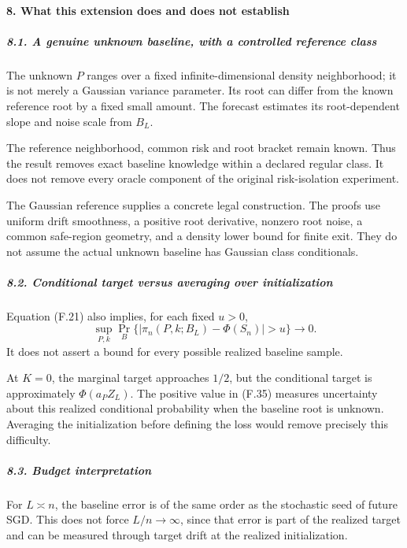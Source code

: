 \paragraph{8. What this extension does and does not
establish}\label{what-this-extension-does-and-does-not-establish}

\subparagraph{8.1. A genuine unknown baseline, with a controlled
reference
class}\label{a-genuine-unknown-baseline-with-a-controlled-reference-class}

The unknown \(P\) ranges over a fixed infinite-dimensional density
neighborhood; it is not merely a Gaussian variance parameter. Its root
can differ from the known reference root by a fixed small amount. The
forecast estimates its root-dependent slope and noise scale from
\(B_L\).

The reference neighborhood, common risk and root bracket remain known.
Thus the result removes exact baseline knowledge within a declared
regular class. It does not remove every oracle component of the original
risk-isolation experiment.

The Gaussian reference supplies a concrete legal construction. The
proofs use uniform drift smoothness, a positive root derivative, nonzero
root noise, a common safe-region geometry, and a density lower bound for
finite exit. They do not assume the actual unknown baseline has Gaussian
class conditionals.

\subparagraph{8.2. Conditional target versus averaging over
initialization}\label{conditional-target-versus-averaging-over-initialization}

Equation (F.21) also implies, for each fixed \(u>0\), \[
\sup_{P,k}\Pr_B\{
|\pi_n(P,k;B_L)-\Phi(S_n)|>u
\}\longrightarrow0.
\] It does not assert a bound for every possible realized baseline
sample.

At \(K=0\), the marginal target approaches \(1/2\), but the conditional
target is approximately \(\Phi(a_PZ_L)\). The positive value in (F.35)
measures uncertainty about this realized conditional probability when
the baseline root is unknown. Averaging the initialization before
defining the loss would remove precisely this difficulty.

\subparagraph{8.3. Budget interpretation}\label{budget-interpretation}

For \(L\asymp n\), the baseline error is of the same order as the
stochastic seed of future SGD. This does not force \(L/n\to\infty\),
since that error is part of the realized target and can be measured
through target drift at the realized initialization.

